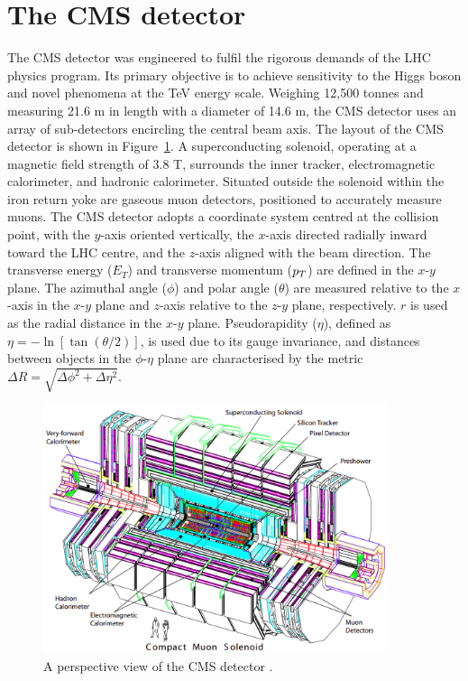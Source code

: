 \section{The CMS detector}

The \ac{CMS} detector was engineered to fulfil the rigorous demands of the \ac{LHC} physics program. 
Its primary objective is to achieve sensitivity to the Higgs boson and novel phenomena at the TeV energy scale. 
Weighing 12,500 tonnes and measuring 21.6 m in length with a diameter of 14.6 m, the \ac{CMS} detector uses an array of sub-detectors encircling the central beam axis. 
The layout of the \ac{CMS} detector is shown in Figure~\ref{fig:CMS_Schematic}.
A superconducting solenoid, operating at a magnetic field strength of 3.8 T, surrounds the inner tracker, electromagnetic calorimeter, and hadronic calorimeter. 
Situated outside the solenoid within the iron return yoke are gaseous muon detectors, positioned to accurately measure muons. 
The \ac{CMS} detector adopts a coordinate system centred at the collision point, with the $y$-axis oriented vertically, the $x$-axis directed radially inward toward the \ac{LHC} centre, and the $z$-axis aligned with the beam direction. 
The transverse energy ($E_T$) and transverse momentum ($p_{T}$) are defined in the $x$-$y$ plane. 
The azimuthal angle ($\phi$) and polar angle ($\theta$) are measured relative to the $x$-axis in the $x$-$y$ plane and $z$-axis relative to the $z$-$y$ plane, respectively. 
$r$ is used as the radial distance in the $x$-$y$ plane.
Pseudorapidity ($\eta$), defined as $\eta = -\ln[\tan(\theta/2)]$, is used due to its gauge invariance, and distances between objects in the $\phi$-$\eta$ plane are characterised by the metric $\Delta R = \sqrt{\Delta\phi^2 + \Delta\eta^2}$. 

\begin{figure}[h]
    \centering
    \includegraphics[width=0.9\textwidth]{Figures/CMS_Detector.png}
    \caption[Diagram of the CMS detector.]{A perspective view of the \ac{CMS} detector \cite{CMS_Setup}.}
    \label{fig:CMS_Schematic}
\end{figure}

